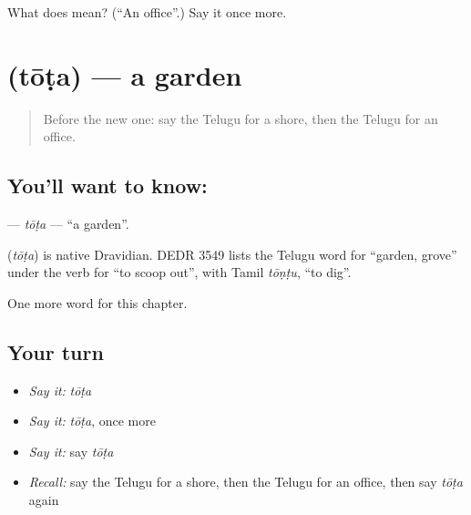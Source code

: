 \begin{tcolorbox}[breakable,colback=teal!4,colframe=teal!35!black,title={Before you move on}]
What does  mean? (\textquotedblleft{}An office\textquotedblright{}.) Say it once more.
\end{tcolorbox}
\section[\texorpdfstring{\te{తోట} (tōṭa)}{తోట (tōṭa)}]{ (tōṭa) — a garden}

\label{lesson:TE-C104-tota}



\begin{quote}
Before the new one: say the Telugu for a shore, then the Telugu for an office.
\end{quote}

\subsection*{You'll want to know: }
\textbf{} — \emph{tōṭa} — \textquotedblleft{}a garden\textquotedblright{}.

\begin{cousinweb}
\textbf{} (\emph{tōṭa}) is native Dravidian. DEDR 3549 lists the Telugu word for \textquotedblleft{}garden, grove\textquotedblright{} under the verb for \textquotedblleft{}to scoop out\textquotedblright{}, with Tamil \emph{tōṇṭu}, \textquotedblleft{}to dig\textquotedblright{}.
\end{cousinweb}

\begin{grammarlens}[title={What you've built}]
One more word for this chapter.
\end{grammarlens}

\subsection*{Your turn}
\begin{itemize}
\raggedright
  \item \emph{Say it:} \emph{tōṭa}
  \item \emph{Say it:} \emph{tōṭa}, once more
  \item \emph{Say it:} say \emph{tōṭa}
  \item \emph{Recall:} say the Telugu for a shore, then the Telugu for an office, then say \emph{tōṭa} again
\end{itemize}

